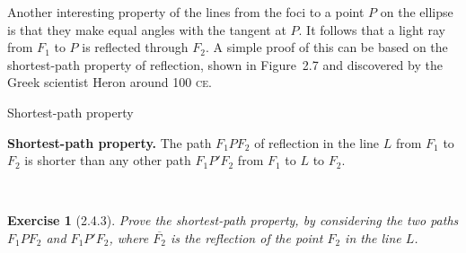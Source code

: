 \documentclass[12pt]{article}
\newcommand{\XB}{\color{black}}
\newcommand{\XBB}{\color{blue}}
\theoremstyle{plain}
\newtheorem{ex}{Exercise}
\begin{document}
\newpage

Another interesting property of the lines from the foci to a point $P$ on the ellipse is that they make equal angles with the tangent at $P$. It follows that a light ray from $F_1$ to $P$ is reflected through $F_2$. A simple proof of this can be based on the shortest-path property of reflection, shown in Figure~2.7 and discovered by the Greek scientist Heron around 100 \textsc{ce}.

\begin{center}

  Shortest-path property
\end{center}

\vfill

\textbf{Shortest-path property.} The path $F_1PF_2$ of reflection in the line $L$ from $F_1$ to $F_2$ is shorter than any other path $F_1P'F_2$ from $F_1$ to $L$ to $F_2$.

\newpage
\XBB\hrulefill\XB \\
\begin{ex} [2.4.3]
  Prove the shortest-path property, by considering the two paths $F_1PF_2$ and $F_1P'F_2$, where $\overline{F_2}$ is the reflection of the point $F_2$ in the line $L$.
\end{ex}
\XBB\hrulefill\XB \\
\end{document}
